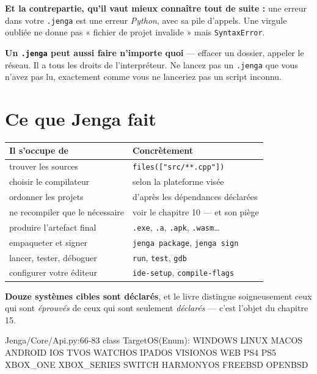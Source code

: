 \begin{nkpiege}
\textbf{Et la contrepartie, qu'il vaut mieux connaître tout de suite :} une
erreur dans votre \texttt{.jenga} est une erreur \emph{Python}, avec sa pile
d'appels. Une virgule oubliée ne donne pas « fichier de projet invalide » mais
\texttt{SyntaxError}.

\textbf{Un \texttt{.jenga} peut aussi faire n'importe quoi} --- effacer un
dossier, appeler le réseau. Il a tous les droits de l'interpréteur. Ne lancez
pas un \texttt{.jenga} que vous n'avez pas lu, exactement comme vous ne lanceriez
pas un script inconnu.
\end{nkpiege}

\section{Ce que Jenga fait}

\begin{center}
\begin{tabular}{@{}ll@{}}
\toprule
\textbf{Il s'occupe de} & \textbf{Concrètement} \\
\midrule
trouver les sources & \texttt{files(["src/**.cpp"])} \\
choisir le compilateur & selon la plateforme visée \\
ordonner les projets & d'après les dépendances déclarées \\
ne recompiler que le nécessaire & voir le chapitre 10 --- et son piège \\
produire l'artefact final & \texttt{.exe}, \texttt{.a}, \texttt{.apk}, \texttt{.wasm}\dots \\
empaqueter et signer & \texttt{jenga package}, \texttt{jenga sign} \\
lancer, tester, déboguer & \texttt{run}, \texttt{test}, \texttt{gdb} \\
configurer votre éditeur & \texttt{ide-setup}, \texttt{compile-flags} \\
\bottomrule
\end{tabular}
\end{center}

\begin{nkretenir}
\textbf{Douze systèmes cibles sont déclarés}, et le livre distingue soigneusement
ceux qui sont \emph{éprouvés} de ceux qui sont seulement \emph{déclarés} --- c'est
l'objet du chapitre 15.

\begin{nkcode}{Jenga/Core/Api.py:66-83}
class TargetOS(Enum):
    WINDOWS  LINUX  MACOS  ANDROID  IOS  TVOS  WATCHOS  IPADOS
    VISIONOS  WEB  PS4  PS5  XBOX_ONE  XBOX_SERIES  SWITCH
    HARMONYOS  FREEBSD  OPENBSD
\end{nkcode}
\end{nkretenir}

